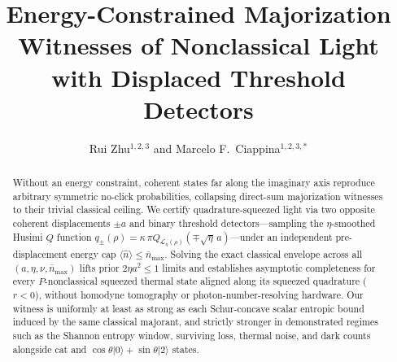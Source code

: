 \documentclass{iopjournal}
\newcommand{\ket}[1]{\lvert #1\rangle}
\begin{document}
  

\title{Energy-Constrained Majorization Witnesses of Nonclassical Light with Displaced Threshold Detectors}

\author{Rui Zhu$^{1,2,3}$ and Marcelo F.\ Ciappina$^{1,2,3,*}$}



%




\begin{abstract}
Without an energy constraint, coherent states far along the imaginary axis reproduce arbitrary symmetric no-click probabilities, collapsing direct-sum majorization witnesses to their trivial classical ceiling. We certify quadrature-squeezed light via two opposite coherent displacements $\pm a$ and binary threshold detectors---sampling the $\eta$-smoothed Husimi $Q$ function $q_\pm(\rho) = \kappa\,\pi Q_{\mathcal{L}_\eta(\rho)}(\mp\sqrt{\eta}\,a)$---under an independent pre-displacement energy cap $\langle\hat n\rangle \le \bar n_{\max}$. Solving the exact classical envelope across all $(a, \eta, \nu, \bar n_{\max})$ lifts prior $2\eta a^2 \le 1$ limits and establishes asymptotic completeness for every $P$-nonclassical squeezed thermal state aligned along its squeezed quadrature ($r < 0$), without homodyne tomography or photon-number-resolving hardware. Our witness is uniformly at least as strong as each Schur-concave scalar entropic bound induced by the same classical majorant, and strictly stronger in demonstrated regimes such as the Shannon entropy window, surviving loss, thermal noise, and dark counts alongside cat and $\cos\theta\ket{0}+\sin\theta\ket{2}$ states.
\end{abstract}
\end{document}
